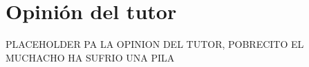 \chapter*{Opinión del tutor}
PLACEHOLDER PA LA OPINION DEL TUTOR, POBRECITO EL MUCHACHO HA SUFRIO UNA PILA